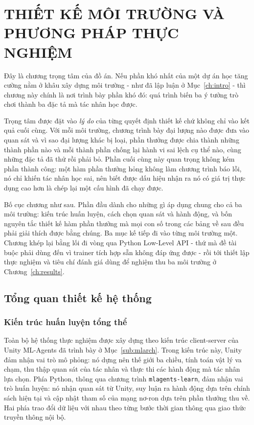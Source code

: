 \fontsize{13pt}{22.5pt}\selectfont

\section{THIẾT KẾ MÔI TRƯỜNG VÀ PHƯƠNG PHÁP THỰC NGHIỆM}
\label{ch:design}

\indent Đây là chương trọng tâm của đồ án. Nếu phần khó nhất của một dự án học tăng
cường nằm ở khâu xây dựng môi trường - như đã lập luận ở Mục~\ref{ch:intro} - thì
chương này chính là nơi trình bày phần khó đó: quá trình biến ba ý tưởng trò chơi thành
ba đặc tả mà tác nhân học được.

\indent Trọng tâm được đặt vào \textit{lý do} của từng quyết định thiết kế chứ không
chỉ vào kết quả cuối cùng. Với mỗi môi trường, chương trình bày đại lượng nào được đưa
vào quan sát và vì sao đại lượng khác bị loại, phần thưởng được chia thành những thành
phần nào và mỗi thành phần chống lại hành vi sai lệch cụ thể nào, cùng những đặc tả đã
thử rồi phải bỏ. Phần cuối cùng này quan trọng không kém phần thành công: một hàm phần
thưởng hỏng không làm chương trình báo lỗi, nó chỉ khiến tác nhân học sai, nên biết
được dấu hiệu nhận ra nó có giá trị thực dụng cao hơn là chép lại một cấu hình đã chạy
được.

\indent Bố cục chương như sau. Phần đầu dành cho những gì áp dụng chung cho cả ba môi
trường: kiến trúc huấn luyện, cách chọn quan sát và hành động, và bốn nguyên tắc thiết
kế hàm phần thưởng mà mọi con số trong các bảng về sau đều phải giải thích được bằng
chúng. Ba mục kế tiếp đi vào từng môi trường một. Chương khép lại bằng lối đi vòng qua
Python Low-Level API - thứ mà đề tài buộc phải dùng đến vì trainer tích hợp sẵn không
đáp ứng được - rồi tới thiết lập thực nghiệm và tiêu chí đánh giá dùng để nghiệm thu ba
môi trường ở Chương~\ref{ch:results}.

\subsection{Tổng quan thiết kế hệ thống}

\subsubsection{Kiến trúc huấn luyện tổng thể}
\indent Toàn bộ hệ thống thực nghiệm được xây dựng theo kiến trúc client-server của
Unity ML-Agents đã trình bày ở Mục~\ref{sub:mlarch}. Trong kiến trúc này, Unity đảm
nhận vai trò mô phỏng: nó dựng nên thế giới ba chiều, tính toán vật lý va chạm, thu
thập quan sát của tác nhân và thực thi các hành động mà tác nhân lựa chọn. Phía Python,
thông qua chương trình \texttt{mlagents-learn}, đảm nhận vai trò huấn luyện: nó nhận
quan sát từ Unity, suy luận ra hành động dựa trên chính sách hiện tại và cập nhật tham
số của mạng nơ-ron dựa trên phần thưởng thu về. Hai phía trao đổi dữ liệu với nhau
theo từng bước thời gian thông qua giao thức truyền thông nội bộ.

